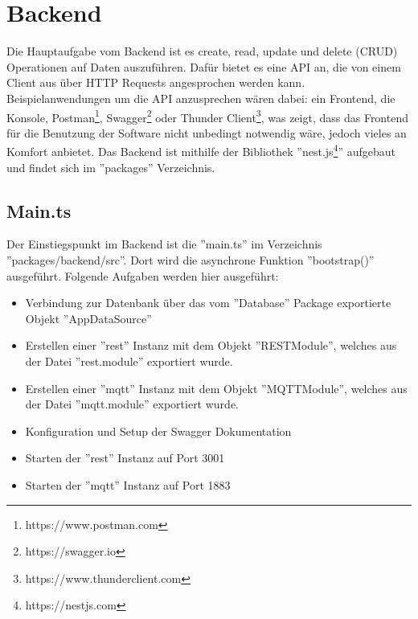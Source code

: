 \chapter{Backend}
Die Hauptaufgabe vom Backend ist es create, read, update und delete (CRUD) Operationen auf Daten auszuführen. Dafür bietet es eine API an, die von einem Client aus über HTTP Requests angesprochen werden kann. Beispielanwendungen um die API anzusprechen wären dabei: ein Frontend, die Konsole, Postman\footnote{https://www.postman.com}, Swagger\footnote{https://swagger.io} oder Thunder Client\footnote{https://www.thunderclient.com}, was zeigt, dass das Frontend für die Benutzung der Software nicht unbedingt notwendig wäre, jedoch vieles an Komfort anbietet. Das Backend ist mithilfe der Bibliothek ''nest.js\footnote{https://nestjs.com}'' aufgebaut und findet sich im ''packages'' Verzeichnis.

\section{Main.ts}
Der Einstiegspunkt im Backend ist die ''main.ts'' im Verzeichnis ''packages/backend/src''. Dort wird die asynchrone Funktion ''bootstrap()'' ausgeführt. Folgende Aufgaben werden hier ausgeführt:
\begin{itemize}
    \item Verbindung zur Datenbank über das vom ''Database'' Package exportierte Objekt ''AppDataSource''
    \item Erstellen einer ''rest'' Instanz mit dem Objekt ''RESTModule'', welches aus der Datei ''rest.module'' exportiert wurde.
    \item Erstellen einer ''mqtt'' Instanz mit dem Objekt ''MQTTModule'', welches aus der Datei ''mqtt.module'' exportiert wurde.
    \item Konfiguration und Setup der Swagger Dokumentation
    \item Starten der ''rest'' Instanz auf Port 3001
    \item Starten der ''mqtt'' Instanz auf Port 1883
\end{itemize}

